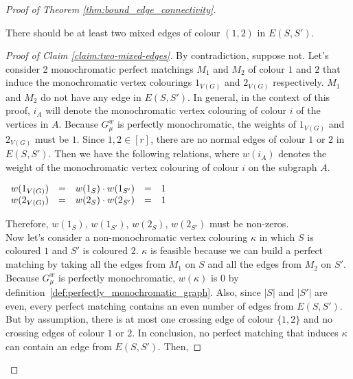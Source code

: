 \begin{proof}[Proof of Theorem \ref{thm:bound_edge_connectivity}]
\begin{enumerate}
\begin{enumerate}
                    \begin{claim}
                        \label{claim:two-mixed-edges}
                        There should be at least two mixed edges of colour $(1, 2)$ in $E(S, S')$.
                    \end{claim}
                    
                    \begin{proof}[Proof of Claim \ref{claim:two-mixed-edges}]
                        By contradiction, suppose not.
                        Let's consider 2 monochromatic perfect matchings $M_1$ and $M_2$ of colour $1$ and $2$ that induce the monochromatic vertex colourings $1_{V(G)}$ and $2_{V(G)}$ respectively.
                        $M_1$ and $M_2$ do not have any edge in $E(S, S')$.
                        In general, in the context of this proof, $i_A$ will denote the monochromatic vertex colouring of colour $i$ of the vertices in $A$.
                        Because $G_\mu^w$ is perfectly monochromatic, the weights of $1_{V(G)}$ and $2_{V(G)}$ must be $1$.
                        Since $1, 2 \in [r]$, there are no normal edges of colour $1$ or $2$ in $E(S, S')$.
                        Then we have the following relations, where $w(i_A)$ denotes the weight of the monochromatic vertex colouring of colour $i$ on the subgraph $A$.
                        
                        \begin{center}
                            $\begin{array}{l c l c l}
                                w(1_{V(G)}) & = & w(1_S) \cdot w(1_{S'}) & = & 1 \\
                                w(2_{V(G)}) & = & w(2_S) \cdot w(2_{S'}) & = & 1
                            \end{array}$
                        \end{center}
                        
                        Therefore, $w(1_S)$, $w(1_{S'})$, $w(2_S)$, $w(2_{S'})$ must be non-zeros. \\

                        Now let's consider a non-monochromatic vertex colouring $\kappa$ in which $S$ is coloured $1$ and $S'$ is coloured $2$.
                        $\kappa$ is feasible because we can build a perfect matching by taking all the edges from $M_1$ on $S$ and all the edges from $M_2$ on $S'$.
                        Because $G_\mu^w$ is perfectly monochromatic, $w(\kappa)$ is 0 by definition~\ref{def:perfectly_monochromatic_graph}.
                        Also, since $|S|$ and $|S'|$ are even, every perfect matching contains an even number of edges from $E(S, S')$.
                        But by assumption, there is at most one crossing edge of colour $\{1, 2\}$ and no crossing edges of colour $1$ or $2$.
                        In conclusion, no perfect matching that induces $\kappa$ can contain an edge from $E(S, S')$.
                        Then,
                        

\end{proof}
\end{enumerate}
\end{enumerate}
\end{proof}
